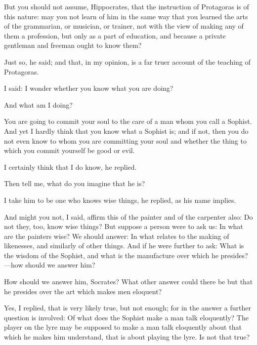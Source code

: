 \documentclass[11pt,letter]{article}
\begin{document}
\par  But you should not assume, Hippocrates, that the instruction of Protagoras is of this nature: may you not learn of him in the same way that you learned the arts of the grammarian, or musician, or trainer, not with the view of making any of them a profession, but only as a part of education, and because a private gentleman and freeman ought to know them?

\par  Just so, he said; and that, in my opinion, is a far truer account of the teaching of Protagoras.

\par  I said: I wonder whether you know what you are doing?

\par  And what am I doing?

\par  You are going to commit your soul to the care of a man whom you call a Sophist. And yet I hardly think that you know what a Sophist is; and if not, then you do not even know to whom you are committing your soul and whether the thing to which you commit yourself be good or evil.

\par  I certainly think that I do know, he replied.

\par  Then tell me, what do you imagine that he is?

\par  I take him to be one who knows wise things, he replied, as his name implies.

\par  And might you not, I said, affirm this of the painter and of the carpenter also: Do not they, too, know wise things? But suppose a person were to ask us: In what are the painters wise? We should answer: In what relates to the making of likenesses, and similarly of other things. And if he were further to ask: What is the wisdom of the Sophist, and what is the manufacture over which he presides?—how should we answer him?

\par  How should we answer him, Socrates? What other answer could there be but that he presides over the art which makes men eloquent?

\par  Yes, I replied, that is very likely true, but not enough; for in the answer a further question is involved: Of what does the Sophist make a man talk eloquently? The player on the lyre may be supposed to make a man talk eloquently about that which he makes him understand, that is about playing the lyre. Is not that true?
\end{document}
